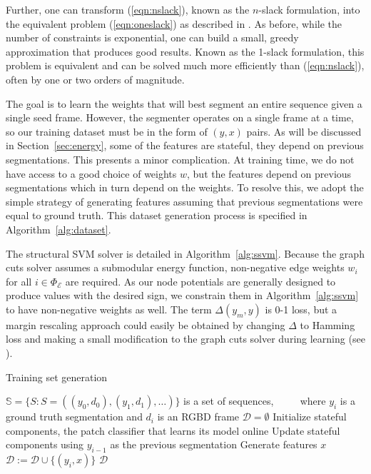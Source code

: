 \documentclass[journal]{IEEEtran}
\begin{document}
Further, one can transform (\ref{eqn:nslack}), known as the $n$-slack formulation, into the equivalent problem (\ref{eqn:oneslack}) as described in \cite{joachims2009a}.  As before, while the number of constraints is exponential, one can build a small, greedy approximation that produces good results.  Known as the 1-slack formulation, this problem is equivalent and can be solved much more efficiently than (\ref{eqn:nslack}), often by one or two orders of magnitude.


The goal is to learn the weights that will best segment an entire sequence given a single seed frame.  However, the segmenter operates on a single frame at a time, so our training dataset must be in the form of $(y, x)$ pairs. As will be discussed in Section~\ref{sec:energy}, some of the features are stateful, \ie they depend on previous segmentations.  This presents a minor complication.  At training time, we do not have access to a good choice of weights $w$, but the features depend on previous segmentations which in turn depend on the weights.  To resolve this, we adopt the simple strategy of generating features assuming that previous segmentations were equal to ground truth.  This dataset generation process is specified in Algorithm~\ref{alg:dataset}.

The structural SVM solver is detailed in Algorithm~\ref{alg:ssvm}.  Because the graph cuts solver assumes a submodular energy function, non-negative edge weights $w_i$ for all $i \in \Phi_{\mathcal{E}}$ are required.  As our node potentials are generally designed to produce values with the desired sign, we constrain them in Algorithm~\ref{alg:ssvm} to have non-negative weights as well.  The term $\Delta (y_m, y)$ is 0-1 loss, but a margin rescaling approach could easily be obtained by changing $\Delta$ to Hamming loss and making a small modification to the graph cuts solver during learning (see \cite{szummer2008a}). 

\begin{algorithm}
  \caption{Training set generation}
  \label{alg:dataset}
  \begin{algorithmic}
    \STATE $\mathbb{S} = \{S : S = ((y_0, d_0), (y_1, d_1),                       \dots)\}$ is a set of sequences,
\STATE $\qquad$ where $y_i$ is a ground truth segmentation and $d_i$ is an RGBD frame
\STATE $\mathcal{D} = \emptyset$
\STATE Initialize stateful components, \eg the patch classifier that learns its model online
\STATE Update stateful components using $y_{i-1}$ as the previous segmentation
\STATE Generate features $x$
\STATE $\mathcal{D} := \mathcal{D} \cup \{(y_i, x)\}$
\ENDFOR
\ENDFOR
\RETURN $\mathcal{D}$
  \end{algorithmic}
\end{algorithm}
\end{document}
